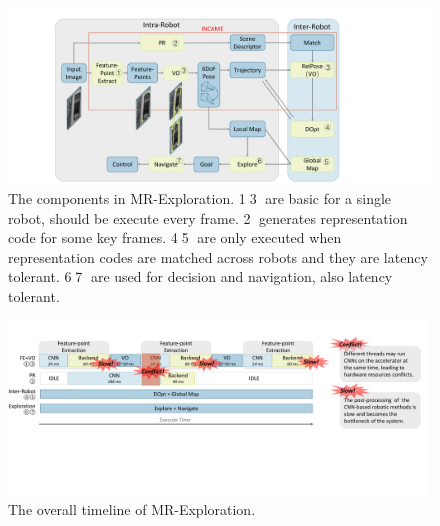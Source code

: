 \begin{figure}[t]
    \centering
    \vspace{-0.1cm} 
    \setlength{\abovecaptionskip}{0cm} 
    \setlength{\belowcaptionskip}{-0.05cm} 
	\includegraphics[width=0.99\linewidth]{fig/maexp.pdf}
    \caption{
        The components in MR-Exploration. \textcircled{1}\textcircled{3} are basic for a single robot, should be execute every frame. \textcircled{2} generates representation code for some key frames. \textcircled{4}\textcircled{5} are only executed when representation codes are matched across robots and they are latency tolerant.  \textcircled{6}\textcircled{7} are used for decision and navigation, also latency tolerant.
    }
	\label{fig:maexp}
\end{figure}






\begin{figure}[t]
    \centering
    \vspace{-0.1cm} 
    \setlength{\abovecaptionskip}{0cm} 
    \setlength{\belowcaptionskip}{-0.05cm} 
	\includegraphics[width=0.99\textwidth]{fig/overalltime.pdf} 	
    \caption{
    The overall timeline of MR-Exploration.
    }
	\label{fig:overalltime}
\end{figure}

